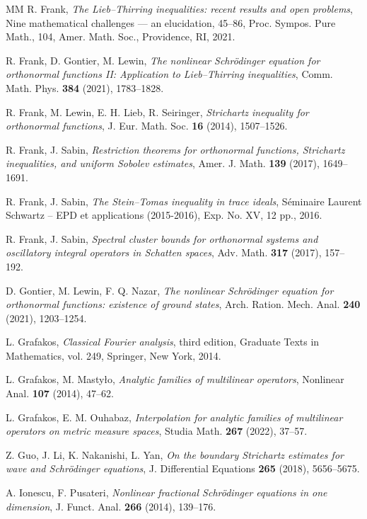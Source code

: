 \documentclass[a4paper]{amsart}
\numberwithin{equation}{section}%
\theoremstyle{plain}%
\theoremstyle{definition}
\theoremstyle{remark}%
\begin{document}
\begin{thebibliography}{MM}
 R. Frank, \textit{The Lieb--Thirring inequalities: recent results and open problems}, Nine mathematical challenges — an elucidation, 45--86, Proc. Sympos. Pure Math., 104, Amer. Math. Soc., Providence, RI, 2021.

 R. Frank, D. Gontier, M. Lewin, \textit{The nonlinear Schr\"odinger equation for orthonormal functions II: Application to Lieb--Thirring inequalities}, Comm. Math. Phys. \textbf{384} (2021), 1783--1828.

 R. Frank, M. Lewin, E. H. Lieb, R. Seiringer, \textit{Strichartz inequality for orthonormal functions}, J. Eur. Math. Soc. \textbf{16} (2014), 1507--1526.

 R. Frank, J. Sabin, \textit{Restriction theorems for orthonormal functions, Strichartz inequalities, and uniform Sobolev estimates}, Amer. J. Math. \textbf{139} (2017), 1649--1691.

 R. Frank, J. Sabin, \textit{The Stein--Tomas inequality in trace ideals}, S\'eminaire Laurent Schwartz -- EPD et applications (2015-2016), Exp. No. XV, 12 pp., 2016.

  R. Frank, J. Sabin, \textit{Spectral cluster bounds for orthonormal systems and oscillatory integral operators in Schatten spaces}, Adv. Math. \textbf{317} (2017), 157--192. 

  D. Gontier, M. Lewin, F. Q. Nazar, \textit{The nonlinear Schr\"odinger equation for orthonormal functions: existence of ground states}, Arch. Ration. Mech. Anal. \textbf{240} (2021), 1203--1254.

 L. Grafakos, \textit{Classical Fourier analysis}, third edition, Graduate Texts in Mathematics, vol. 249, Springer, New York, 2014.

 L. Grafakos, M. Masty\l o, \textit{Analytic families of multilinear operators}, Nonlinear Anal. \textbf{107} (2014), 47--62.

 L. Grafakos, E. M. Ouhabaz, \textit{Interpolation for analytic families of multilinear operators on metric measure spaces}, Studia Math. \textbf{267} (2022), 37--57.

 Z. Guo, J. Li, K. Nakanishi, L. Yan, \textit{On the boundary Strichartz estimates for wave and Schr\"{o}dinger equations}, J. Differential Equations \textbf{265} (2018), 5656--5675.


A. Ionescu, F. Pusateri, \textit{Nonlinear fractional Schrödinger equations in one dimension}, J. Funct. Anal. \textbf{266} (2014),
139--176.


\end{thebibliography}
\end{document}
